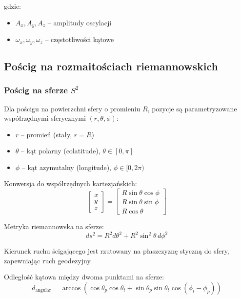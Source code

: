 \documentclass[12pt,a4paper]{article}
\begin{document}
gdzie:
\begin{itemize}
    \item $A_x, A_y, A_z$ -- amplitudy oscylacji
    \item $\omega_x, \omega_y, \omega_z$ -- częstotliwości kątowe
\end{itemize}

\subsection{Pościg na rozmaitościach riemannowskich}

\subsubsection{Pościg na sferze $S^2$}

Dla pościgu na powierzchni sfery o promieniu $R$, pozycje są parametryzowane współrzędnymi sferycznymi $(r, \theta, \phi)$:
\begin{itemize}
    \item $r$ -- promień (stały, $r = R$)
    \item $\theta$ -- kąt polarny (colatitude), $\theta \in [0, \pi]$
    \item $\phi$ -- kąt azymutalny (longitude), $\phi \in [0, 2\pi)$
\end{itemize}

Konwersja do współrzędnych kartezjańskich:
\begin{equation}
\begin{bmatrix} x \\ y \\ z \end{bmatrix} = \begin{bmatrix} R \sin\theta \cos\phi \\ R \sin\theta \sin\phi \\ R \cos\theta \end{bmatrix}
\end{equation}

Metryka riemannowska na sferze:
\begin{equation}
ds^2 = R^2 d\theta^2 + R^2 \sin^2\theta \, d\phi^2
\end{equation}

Kierunek ruchu ścigającego jest rzutowany na płaszczyznę styczną do sfery, zapewniając ruch geodezyjny.

Odległość kątowa między dwoma punktami na sferze:
\begin{equation}
d_{\text{angular}} = \arccos(\cos\theta_p \cos\theta_t + \sin\theta_p \sin\theta_t \cos(\phi_t - \phi_p))
\end{equation}
\end{document}
